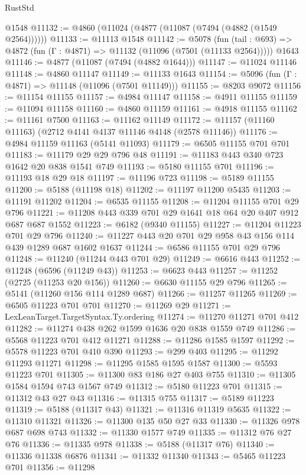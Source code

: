 \begin{lexlean}{RustStd}
\begin{coremodule}
    @1548
@11132 := @4860 (@11024 (@4877 (@11087 (@7494 (@4882 (@1549 @2564))))))
@11133 := @11113 @1548
@11142 := @5078
    (fun (tail : @693) => @4872 (fun (Γ : @4871) => @11132 (@11096 (@7501 (@11133 @2564)))))
    @1643
@11146 := @4877 (@11087 (@7494 (@4882 @1644)))
@11147 := @11024 @11146
@11148 := @4860 @11147
@11149 := @11133 @1643
@11154 := @5096 (fun (Γ : @4871) => @11148 (@11096 (@7501 @11149)))
@11155 := @8203 @9072
@11156 := @11154 @11155
@11157 := @4984 @11147
@11158 := @4911 @11155
@11159 := @11094 @11158
@11160 := @4860 @11159
@11161 := @4918 @11155
@11162 := @11161 @7500
@11163 := @11162 @11149
@11172 := @11157 (@11160 @11163) (@2712 @4141 @4137 @11146 @4148 (@2578 @11146))
@11176 := @4984 @11159 @11163 (@5141 @11093)
@11179 := @6505 @11155 @701 @701
@11183 := @11179 @29 @29 @796 @48
@11191 := @11183 @443 @340 @723 @1642 @20 @838 @1541 @749
@11193 := @5180 @11155 @701
@11196 := @11193 @18 @29 @18
@11197 := @11196 @723
@11198 := @5189 @11155
@11200 := @5188 (@11198 @18)
@11202 := @11197 @11200 @5435
@11203 := @11191 @11202
@11204 := @6535 @11155
@11208 := @11204 @11155 @701 @29 @796
@11221 := @11208 @443 @339 @701 @29 @1641 @18 @64 @20 @407 @912 @687 @687 @1552
@11223 := @6182 (@9340 @11155)
@11227 := @11204 @11223 @701 @29 @796
@11240 := @11227 @443 @20 @701 @29 @958 @43 @156 @114 @439 @1289 @687 @1602 @1637
@11244 := @6586 @11155 @701 @29 @796
@11248 := @11240 (@11244 @443 @701 @29)
@11249 := @6616 @443
@11252 := @11248 (@6596 (@11249 @43))
@11253 := @6623 @443
@11257 := @11252 (@2725 (@11253 @20 @156))
@11260 := @6630 @11155 @29 @796
@11265 := @5141 (@11260 @156 @114 @1289 @687)
@11266 := @11257 @11265
@11269 := @6505 @11223 @701 @701
@11270 := @11269 @29
@11271 := LexLeanTarget.TargetSyntax.Ty.ordering
@11274 := @11270 @11271 @701 @412
@11282 := @11274 @438 @262 @1599 @1636 @20 @838 @1559 @749
@11286 := @5568 @11223 @701 @412 @11271
@11288 := @11286 @1585 @1597
@11292 := @5578 @11223 @701 @410 @390
@11293 := @299 @403
@11295 := @11292 @11293 @11271
@11298 := @11295 @1585 @1595 @1587
@11300 := @5593 @11223 @701
@11305 := @11300 @83 @186 @27 @403 @755
@11310 := @11305 @1584 @1594 @743 @1567 @749
@11312 := @5180 @11223 @701
@11315 := @11312 @43 @27 @43
@11316 := @11315 @755
@11317 := @5189 @11223
@11319 := @5188 (@11317 @43)
@11321 := @11316 @11319 @5635
@11322 := @11310 @11321
@11326 := @11300 @135 @50 @27 @33
@11330 := @11326 @978 @687 @698 @743
@11332 := @11330 @1577 @749
@11335 := @11312 @76 @27 @76
@11336 := @11335 @978
@11338 := @5188 (@11317 @76)
@11340 := @11336 @11338 @6876
@11341 := @11332 @11340
@11343 := @5465 @11223 @701
@11356 := @11298

\end{coremodule}
\end{lexlean}
